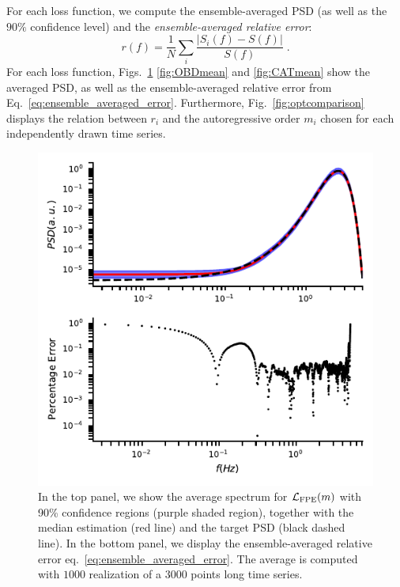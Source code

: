 \documentclass[twocolumn,showpacs,preprintnumbers,nofootinbib,prd,
superscriptaddress,10pt]{revtex4-1}
\begin{document}
For each loss function, we compute the ensemble-averaged PSD (as well as the $90\%$ confidence level) and 
the \textit{ensemble-averaged relative error}:
\begin{equation}\label{eq:ensemble_averaged_error}
	r(f) = \frac{1}{N} \sum_i \frac{|S_i(f) - S(f)|}{S(f)} \;.
\end{equation}
For each loss function, Figs.~\ref{fig:FPEmean} \ref{fig:OBDmean} and \ref{fig:CATmean} show the averaged PSD, 
as well as the ensemble-averaged relative error from Eq.~\eqref{eq:ensemble_averaged_error}.
Furthermore, Fig.~\ref{fig:optcomparison} displays the relation between $r_i$ and the autoregressive 
order $m_i$ chosen for each independently drawn time series.

\begin{figure}[t]
	\centering
	\includegraphics[width = \linewidth]{Images/optimisers_comparison/normal/FPE_spectrum_estim.pdf}
	\caption{In the top panel, we show the average spectrum for $\mathcal{L}_{\rm FPE}(m)$ with 90\% confidence regions (purple shaded region), together with the median estimation (red line) and the target PSD (black dashed line). In the bottom panel, we display the ensemble-averaged relative error eq.~\eqref{eq:ensemble_averaged_error}.
	The average is computed with $1000$ realization of a $3000$ points long time series.}
	\label{fig:FPEmean}
\end{figure}
\end{document}
